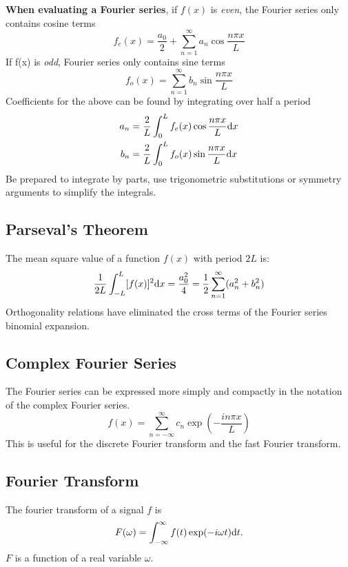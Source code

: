 \textbf{When evaluating a Fourier series}, if $f(x)$ is \textit{even}, the Fourier series only contains cosine terms
\begin{equation*}
    f_e(x) = \frac{a_0}{2} + \sum_{n=1}^{\infty} a_n \cos \frac{n \pi x}{L}
\end{equation*}
If f(x) is \textit{odd}, Fourier series only contains sine terms
\begin{equation*}
    f_o(x) =  \sum_{n=1}^{\infty} b_n \sin \frac{n \pi x}{L}
\end{equation*}
Coefficients for the above can be found by integrating over half a period
\begin{equation*}
    \begin{aligned}
        a_n &= \frac{2}{L}\int_{0}^{L} f_e(x) \cos \frac{n \pi x}{L} \differential x \\
        b_n &= \frac{2}{L}\int_{0}^{L} f_o(x) \sin \frac{n \pi x}{L} \differential x
    \end{aligned}
\end{equation*}
Be prepared to integrate by parts, use trigonometric substitutions or symmetry arguments to simplify the integrals.

\subsection*{Parseval's Theorem}
The mean square value of a function $f(x)$ with period $2L$ is:
\begin{equation*}
    \frac{1}{2L}\int_{-L}^{L}[f(x)]^2 \differential x = \frac{a_0^2}{4} = \frac{1}{2}\sum_{n=1}^{\infty}(a_n^2 + b_n^2)
\end{equation*}
Orthogonality relations have eliminated the cross terms of the Fourier series binomial expansion.
\subsection*{Complex Fourier Series}
The Fourier series can be expressed more simply and compactly in the notation of the complex Fourier series.
\begin{equation*}
    f(x) = \sum_{n = -\infty}^{\infty}c_n \exp\left(-\frac{in\pi x}{L}\right)
\end{equation*}
This is useful for the discrete Fourier transform and the fast Fourier transform.

\subsection*{Fourier Transform}
The fourier transform of a signal $f$ is
\begin{equation*}
    F(\omega) = \int_{-\infty}^{\infty} f(t) \exp(-i\omega t) \differential t.
\end{equation*}
$F$ is a function of a real variable $\omega$. 

